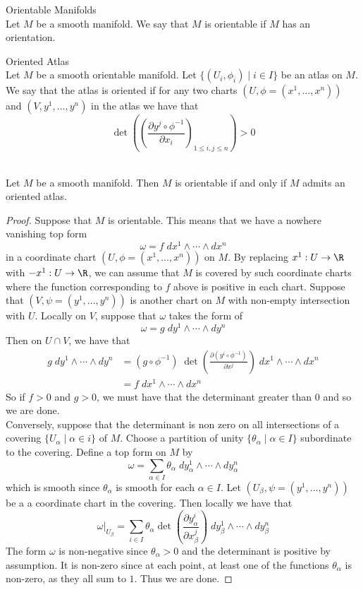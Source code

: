\documentclass[a4paper]{article}
\begin{document}
\begin{defn}{Orientable Manifolds}{}\\
Let $M$ be a smooth manifold. We say that $M$ is orientable if $M$ has an orientation. 
\end{defn}

\begin{defn}{Oriented Atlas}{}\\
Let $M$ be a smooth orientable manifold. Let $\{(U_i,\phi_i)\;|\;i\in I\}$ be an atlas on $M$. We say that the atlas is oriented if for any two charts $(U,\phi=(x^1,\dots,x^n))$ and $(V,y^1,\dots,y^n)$ in the atlas we have that $$\det\left(\left(\frac{\partial y^j\circ\phi^{-1}}{\partial x_i}\right)_{1\leq i,j\leq n}\right)>0$$
\end{defn}

\begin{prp}{}{}\\
Let $M$ be a smooth manifold. Then $M$ is orientable if and only if $M$ admits an oriented atlas. 
\begin{proof}
Suppose that $M$ is orientable. This means that we have a nowhere vanishing top form $$\omega=f\;dx^1\wedge\cdots\wedge dx^n$$ in a coordinate chart $(U,\phi=(x^1,\dots,x^n))$ on $M$. By replacing $x^1:U\to\R$ with $-x^1:U\to\R$, we can assume that $M$ is covered by such coordinate charts where the function corresponding to $f$ above is positive in each chart. Suppose that $(V,\psi=(y^1,\dots,y^n))$ is another chart on $M$ with non-empty intersection with $U$. Locally on $V$, suppose that $\omega$ takes the form of $$\omega=g\;dy^1\wedge\cdots\wedge dy^n$$ Then on $U\cap V$, we have that 
\begin{align*}
g\;dy^1\wedge\cdots\wedge dy^n&=(g\circ\phi^{-1})\;\det\left(\frac{\partial (y^i\circ\phi^{-1})}{\partial x^j}\right)\;dx^1\wedge\cdots\wedge dx^n\\
&=f\;dx^1\wedge\cdots\wedge dx^n
\end{align*}
So if $f>0$ and $g>0$, we must have that the determinant greater than $0$ and so we are done. \\

Conversely, suppose that the determinant is non zero on all intersections of a covering $\{U_\alpha\;|\;\alpha\in i\}$ of $M$. Choose a partition of unity $\{\theta_\alpha\;|\;\alpha\in I\}$ subordinate to the covering. Define a top form on $M$ by $$\omega=\sum_{\alpha\in I}\theta_\alpha\;dy_\alpha^1\wedge\cdots\wedge dy_\alpha^n$$ which is smooth since $\theta_\alpha$ is smooth for each $\alpha\in I$. Let $(U_\beta,\psi=(y^1,\dots,y^n))$ be a a coordinate chart in the covering. Then locally we have that $$\omega|_{U_\beta}=\sum_{i\in I}\theta_\alpha\det\left(\frac{\partial y_\alpha^i}{\partial x_\beta^j}\right)\;dy_\beta^1\wedge\cdots\wedge dy_\beta^n$$ The form $\omega$ is non-negative since $\theta_\alpha>0$ and the determinant is positive by assumption. It is non-zero since at each point, at least one of the functions $\theta_\alpha$ is non-zero, as they all sum to $1$. Thus we are done. 
\end{proof}
\end{prp}
\end{document}
